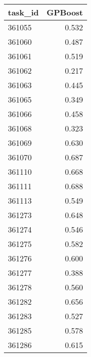 \begin{tabular}{lr}
\toprule
task\_id & GPBoost \\
\midrule
361055 & 0.532 \\
361060 & 0.487 \\
361061 & 0.519 \\
361062 & 0.217 \\
361063 & 0.445 \\
361065 & 0.349 \\
361066 & 0.458 \\
361068 & 0.323 \\
361069 & 0.630 \\
361070 & 0.687 \\
361110 & 0.668 \\
361111 & 0.688 \\
361113 & 0.549 \\
361273 & 0.648 \\
361274 & 0.546 \\
361275 & 0.582 \\
361276 & 0.600 \\
361277 & 0.388 \\
361278 & 0.560 \\
361282 & 0.656 \\
361283 & 0.527 \\
361285 & 0.578 \\
361286 & 0.615 \\
\bottomrule
\end{tabular}
